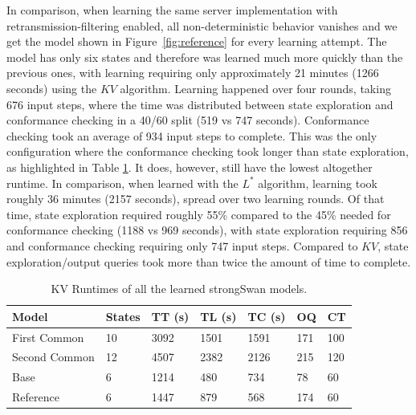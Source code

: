 In comparison, when learning the same server implementation with retransmission-filtering enabled, all non-deterministic behavior vanishes and we get the model shown in Figure~\ref{fig:reference} for every learning attempt. The model has only six states and therefore was learned much more quickly than the previous ones, with learning requiring only approximately 21 minutes (1266 seconds) using the $KV$ algorithm. Learning happened over four rounds, taking 676 input steps, where the time was distributed between state exploration and conformance checking in a 40/60 split (519 vs 747 seconds). Conformance checking took an average of 934 input steps to complete. This was the only configuration where the conformance checking took longer than state exploration, as highlighted in Table \ref{tab:runtime_summary_kv}. It does, however, still have the lowest altogether runtime. In comparison, when learned with the $L^*$ algorithm, learning took roughly 36 minutes (2157 seconds), spread over two learning rounds. Of that time, state exploration required roughly 55\% compared to the 45\% needed for conformance checking (1188 vs 969 seconds), with state exploration requiring 856 and conformance checking requiring only 747 input steps. Compared to $KV$, state exploration/output queries took more than twice the amount of time to complete.\\

\begin{table}[H]
	\centering
	\begin{tabular}{|l|l|l|l|l|l|l|}
		\hline
		\rowcolor[HTML]{C0C0C0} 
		Model     		& States & TT (s)  & TL (s)  & TC (s)  & OQ  & CT  \\ \hline
		First Common 	& 10     & 3092 & 1501 & 1591 & 171 & 100 \\ \hline
		Second Common  	& 12     & 4507 & 2382 & 2126 & 215 & 120 \\ \hline
		Base      		& 6      & 1214 & 480  & 734  & 78  & 60  \\ \hline
		Reference 		& 6      & 1447 & 879  & 568  & 174 & 60  \\ \hline
	\end{tabular}
	\caption{KV Runtimes of all the learned strongSwan models.}
	\label{tab:runtime_summary_kv}
\end{table}

